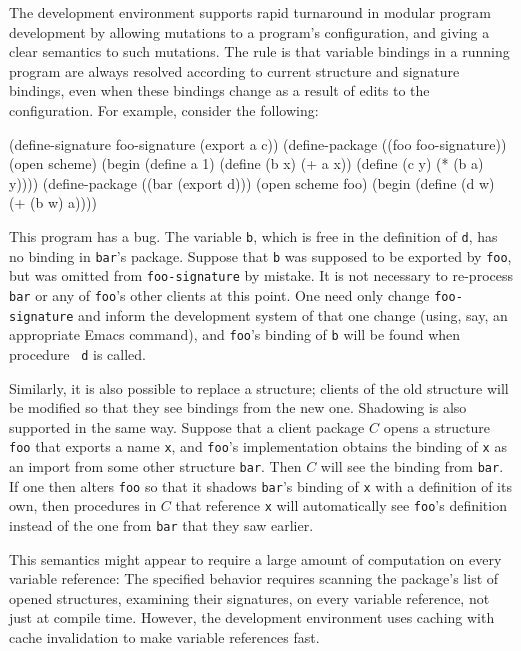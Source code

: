 The \hack{} development environment supports rapid turnaround in
modular program development by allowing mutations to a program's
configuration, and giving a clear semantics to such mutations.  The
rule is that variable bindings in a running program are always
resolved according to current structure and signature bindings, even
when these bindings change as a result of edits to the configuration.
For example, consider the following:
\begin{code}
    (define-signature foo-signature (export a c))
    (define-package ((foo foo-signature))
      (open scheme)
      (begin (define a 1)
	     (define (b x) (+ a x))
	     (define (c y) (* (b a) y))))
    (define-package ((bar (export d)))
      (open scheme foo)
      (begin (define (d w) (+ (b w) a))))
\end{code}
This program has a bug.  The variable {\tt b}, which is free in the
definition of {\tt d}, has no binding in {\tt bar}'s package.  Suppose
that {\tt b} was supposed to be exported by {\tt foo}, but was omitted
from {\tt foo-signature} by mistake.  It is not necessary to
re-process {\tt bar} or any of {\tt foo}'s other clients at this point.
One need only change {\tt foo-signature} and inform the development
system of that one change (using, say, an appropriate Emacs command),
and {\tt foo}'s binding of {\tt b} will be found when procedure {\tt
d} is called.

Similarly, it is also possible to replace a structure; clients of the
old structure will be modified so that they see bindings from the new
one.  Shadowing is also supported in the same way.  Suppose that a
client package $C$ opens a structure {\tt foo} that exports a name
{\tt x}, and {\tt foo}'s implementation obtains the binding of {\tt x}
as an import from some other structure {\tt bar}.  Then $C$ will see
the binding from {\tt bar}.  If one then alters {\tt foo} so that it
shadows {\tt bar}'s binding of {\tt x} with a definition of its own,
then procedures in $C$ that reference {\tt x} will automatically see
{\tt foo}'s definition instead of the one from {\tt bar} that they saw
earlier.

This semantics might appear to require a large amount of computation
on every variable reference: The specified behavior requires scanning
the package's list of opened structures, examining their signatures,
on every variable reference, not just at compile time.  However, the
development environment uses caching with cache invalidation to make
variable references fast.


